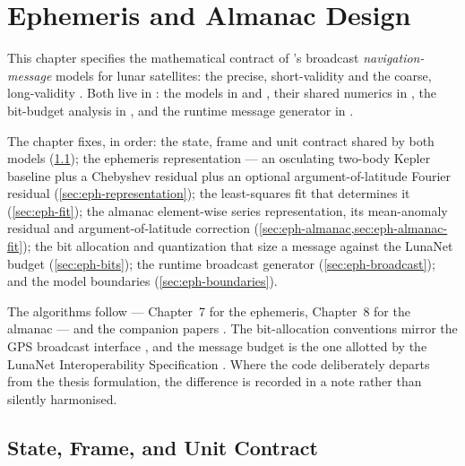 \chapter{Ephemeris and Almanac Design}
\label{chap:ephemeris-almanac}

This chapter specifies the mathematical contract of \lupnt{}'s broadcast
\emph{navigation-message} models for lunar satellites: the precise,
short-validity  and the coarse, long-validity
. Both live in
: the models in
 and
, their shared
numerics in , the
bit-budget analysis in
, and the runtime
message generator in
.

The chapter fixes, in order: the state, frame and unit contract shared by both
models (\cref{sec:eph-contract}); the ephemeris representation --- an
osculating two-body Kepler baseline plus a Chebyshev residual plus an optional
argument-of-latitude Fourier residual (\cref{sec:eph-representation}); the
least-squares fit that determines it (\cref{sec:eph-fit}); the almanac
element-wise series representation, its mean-anomaly residual and
argument-of-latitude correction (\cref{sec:eph-almanac,sec:eph-almanac-fit});
the bit allocation and quantization that size a message against the LunaNet
budget (\cref{sec:eph-bits}); the runtime broadcast generator
(\cref{sec:eph-broadcast}); and the model boundaries
(\cref{sec:eph-boundaries}).

The algorithms follow \citep[Ch.~7, Ch.~8]{iiyama2026thesis} --- Chapter~7 for
the ephemeris, Chapter~8 for the almanac --- and the companion papers
\citep{iiyama2025ephemeris,cortinovis2023ephemeris,cortinovis2024navi}. The
bit-allocation conventions mirror the GPS broadcast interface
\citep{icdgps200}, and the message budget is the one allotted by the LunaNet
Interoperability Specification \citep{lunanet2022}. Where the code
deliberately departs from the thesis formulation, the difference is recorded
in a note rather than silently harmonised.

\section{State, Frame, and Unit Contract}
\label{sec:eph-contract}

